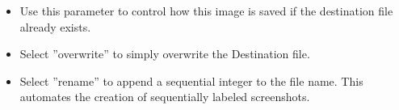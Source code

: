 \begin{itemize}
\item Use this parameter to control how this image is saved if the destination file already exists.
\item Select ''overwrite'' to simply overwrite the Destination file.
\item Select ''rename'' to append a sequential integer to the file name. This automates the creation of sequentially labeled screenshots.
\end{itemize}
